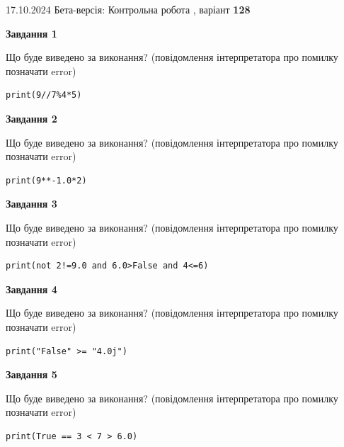 \documentclass[12pt, ukrainian]{article}
\begin{document}
{\Large{17.10.2024 Бета-версія: Контрольна робота , варіант  \No \textbf { 128 }\par}}
{
\begin {large}
{\begin {center}\textbf{Завдання 1}\end {center}}

Що буде виведено за виконання? (повідомлення інтерпретатора про помилку позначати error)\par
\begin{verbatim}
print(9//7%4*5)
\end{verbatim}

{\begin {center}\textbf{Завдання 2}\end {center}}

Що буде виведено за виконання? (повідомлення інтерпретатора про помилку позначати error)\par
\begin{verbatim}
print(9**-1.0*2)
\end{verbatim}

{\begin {center}\textbf{Завдання 3}\end {center}}

Що буде виведено за виконання? (повідомлення інтерпретатора про помилку позначати error)\par
\begin{verbatim}
print(not 2!=9.0 and 6.0>False and 4<=6)
\end{verbatim}

{\begin {center}\textbf{Завдання 4}\end {center}}

Що буде виведено за виконання? (повідомлення інтерпретатора про помилку позначати error)\par
\begin{verbatim}
print("False" >= "4.0j")
\end{verbatim}

{\begin {center}\textbf{Завдання 5}\end {center}}

Що буде виведено за виконання? (повідомлення інтерпретатора про помилку позначати error)\par
\begin{verbatim}
print(True == 3 < 7 > 6.0)
\end{verbatim}


\end{large}}
\end{document}

